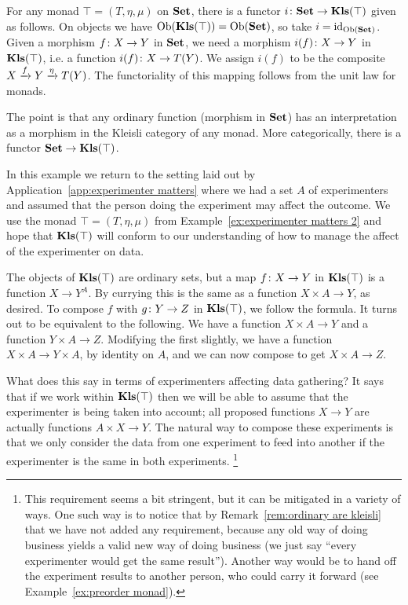 \documentclass[CT4S-EN-RU]{subfiles}
\begin{document}
\begin{exampleRUS}
\end{exampleRUS}

\begin{remarkENG}\label{rem:ordinary are kleisli}
For any monad $\top=(T,\eta,\mu)$ on ${\mathbf{Set}}$, there is a functor $i\colon {\mathbf{Set}}\rightarrow{\mathbf{Kls}}(\top)$ given as follows. On objects we have $\textnormal{Ob}({\mathbf{Kls}}(\top))=\textnormal{Ob}({\mathbf{Set}})$, so take $i=\textnormal{id}_{\textnormal{Ob}({\mathbf{Set}})}$. Given a morphism $f\colon X\rightarrow Y$ in ${\mathbf{Set}}$, we need a morphism $i(f)\colon X\rightarrow Y$ in ${\mathbf{Kls}}(\top)$, i.e. a function $i(f)\colon X\rightarrow T(Y)$. We assign $i(f)$ to be the composite $X\xrightarrow{f}Y\xrightarrow{\eta}T(Y)$. The functoriality of this mapping follows from the unit law for monads.

The point is that any ordinary function (morphism in ${\mathbf{Set}}$) has an interpretation as a morphism in the Kleisli category of any monad. More categorically, there is a functor ${\mathbf{Set}}\rightarrow{\mathbf{Kls}}(\top)$.
\end{remarkENG}

\begin{remarkRUS}\label{rem:ordinary are kleisli}
\end{remarkRUS}

\begin{exampleENG}\label{ex:experimenter matters 3}
In this example we return to the setting laid out by Application~\ref{app:experimenter matters} where we had a set $A$ of experimenters and assumed that the person doing the experiment may affect the outcome. We use the monad $\top=(T,\eta,\mu)$ from Example~\ref{ex:experimenter matters 2} and hope that ${\mathbf{Kls}}(\top)$ will conform to our understanding of how to manage the affect of the experimenter on data.

The objects of ${\mathbf{Kls}}(\top)$ are ordinary sets, but a map $f\colon X\rightarrow Y$ in ${\mathbf{Kls}}(\top)$ is a function $X\to Y^A$. By currying this is the same as a function $X\times A\to Y$, as desired. To compose $f$ with $g\colon Y\rightarrow Z$ in ${\mathbf{Kls}}(\top)$, we follow the formula. It turns out to be equivalent to the following. We have a function $X\times A\to Y$ and a function $Y\times A\to Z$. Modifying the first slightly, we have a function $X\times A\to Y\times A$, by identity on $A$, and we can now compose to get $X\times A\to Z$.

What does this say in terms of experimenters affecting data gathering? It says that if we work within ${\mathbf{Kls}}(\top)$ then we will be able to assume that the experimenter is being taken into account; all proposed functions $X\to Y$ are actually functions $A\times X\to Y$. The natural way to compose these experiments is that we only consider the data from one experiment to feed into another if the experimenter is the same in both experiments.
\footnote{This requirement seems a bit stringent, but it can be mitigated in a variety of ways. One such way is to notice that by Remark~\ref{rem:ordinary are kleisli} that we have not added any requirement, because any old way of doing business yields a valid new way of doing business (we just say “every experimenter would get the same result”). Another way would be to hand off the experiment results to another person, who could carry it forward (see Example~\ref{ex:preorder monad}).}
\end{exampleENG}
\end{document}

